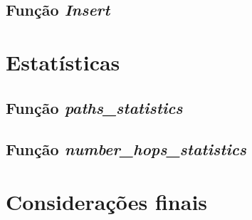 \documentclass[a4paper]{article}
\begin{document}
\subsection{Função \textit{Insert}}

\section{Estatísticas}

\subsection{Função \textit{paths\_statistics}}

\subsection{Função \textit{number\_hops\_statistics}}

\section{Considerações finais}
\end{document}
